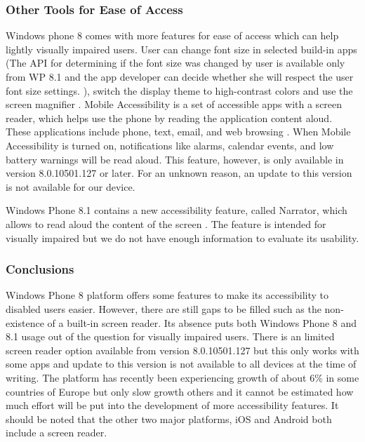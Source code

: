\subsubsection{Other Tools for Ease of Access}
Windows phone 8 comes with more features for ease of access which can help lightly visually impaired users. User can change font size in selected build-in apps (The API for determining if the font size was changed by user is available only from WP 8.1 and the app developer can decide whether she will respect the user font size settings. \cite{wp8accText}), switch the display theme to high-contrast colors and use the screen magnifier \cite{wp8screenreader}. Mobile Accessibility is a set of accessible apps with a screen reader, which helps use the phone by reading the application content aloud. These applications include phone, text, email, and web browsing \cite{wp8screenreader}. When Mobile Accessibility is turned on, notifications like alarms, calendar events, and low battery warnings will be read aloud. This feature, however, is only available in version 8.0.10501.127 \cite{wp8screenreader} or later. For an unknown reason, an update to this version is not available for our device.

Windows Phone 8.1 contains a new accessibility feature, called Narrator, which allows to read aloud the content of the screen \cite{wp8narrator}. The feature is intended for visually impaired but we do not have enough information to evaluate its usability.

\subsubsection{Conclusions}
Windows Phone 8 platform offers some features to make its accessibility to disabled users easier. However, there are still gaps to be filled such as the non-existence of a built-in screen reader. Its absence puts both Windows Phone 8 and 8.1 usage out of the question for visually impaired users. There is an limited screen reader option available from version 8.0.10501.127 \cite{wp8screenreader} but this only works with some apps and update to this version is not available to all devices at the time of writing. The platform has recently been experiencing growth of about 6\% in some countries of Europe but only slow growth others \cite{phone8market} and it cannot be estimated how much effort will be put into the development of more accessibility features. It should be noted that the other two major platforms, iOS and Android both include a screen reader.





